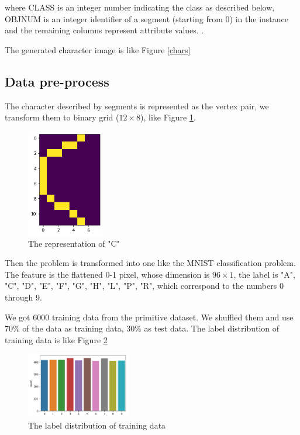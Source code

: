 \documentclass[11pt,en]{elegantpaper}
\begin{document}
where CLASS is an integer number indicating the class as described below, OBJNUM is an integer identifier of a segment (starting from 0) in the instance and the remaining columns represent attribute values. \cite{schapire1999improved}.

The generated character image is like Figure \ref{chars}


\subsection{Data pre-process}
The character described by segments is represented as the vertex pair, we transform them to binary grid ($12\times 8$), like Figure \ref{transform}.

\begin{figure}[h]
	\centering
	\includegraphics[width=0.3\textwidth]{image/C_array}
	\caption{The representation of "C"}
	\label{transform}
\end{figure}

Then the problem is transformed into one like the MNIST classification problem. The feature is the flattened 0-1 pixel, whose dimension is $96\times 1$, the label is "A", "C", "D", "E", "F", 
"G", "H", "L", "P", "R", which correspond to the numbers 0 through 9. 


We got 6000 training data from the primitive dataset. We shuffled them and use 70\% of the data as training data, 30\% as test data. The label distribution of training data is like Figure \ref{dist_y}

\begin{figure}[h]
	\centering
	\includegraphics[width=0.4\textwidth]{image/dis_y}
	\caption{The label distribution of training data}
	\label{dist_y}
\end{figure}
\end{document}

